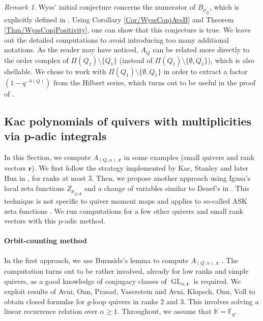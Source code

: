 \documentclass[11pt,english]{article}
\numberwithin{equation}{section}
\numberwithin{figure}{section}
\theoremstyle{definition}
\theoremstyle{plain}
\theoremstyle{remark}
\newtheorem{rmk}[df]{Remark}
\DeclareMathOperator{\GL}{GL}
\newcommand\dd{\mathbf{d}}
\newcommand\rr{\mathbf{r}}
\newcommand\FF{\mathbb{F}}
\newcommand\KK{\mathbb{K}}
\begin{document}
\begin{rmk}

Wyss' initial conjecture concerns the numerator of $B_{\mu_{Q}}$,
which is explicitly defined in \cite[\S 4.6.]{Wys17b}. Using Corollary
\ref{Cor/WyssConjAvsB} and Theorem \ref{Thm/WyssConjPositivity},
one can show that this conjecture is true. We leave out the detailed
computations to avoid introducing too many additional notations. As
the reader may have noticed, $A_{Q}$ can be related more directly
to the order complex of $\Pi(Q_{1})\setminus\{Q_{1}\}$ (instead of
$\Pi(Q_{1})\setminus\{\emptyset,Q_{1}\}$), which is also shellable.
We chose to work with $\Pi(Q_{1})\setminus\{\emptyset,Q_{1}\}$ in
order to extract a factor $(1-q^{-b(Q)})$ from the Hilbert series,
which turns out to be useful in the proof of \cite[Conj. 4.32.]{Wys17b}.

\end{rmk}

\subsection{Kac polynomials of quivers with multiplicities via p-adic integrals
\label{Subsect/KacPol_p-adic}}

In this Section, we compute $A_{(Q,\alpha),\rr}$ in some examples
(small quivers and rank vectors $\rr$). We first follow the strategy
implemented by Kac, Stanley and later Hua in \cite{Kac83,Hua00},
for ranks at most 3. Then, we propose another approach using Igusa's
local zeta functions $Z_{\mu_{Q,\dd}}$ and a change of variables
similar to Denef's in \cite{Den87}. This technique is not specific
to quiver moment maps and applies to so-called ASK zeta functions
\cite{Ros18,RV19,Ros20,CR22}. We run computations for a few other
quivers and small rank vectors with this p-adic method.

\paragraph*{Orbit-counting method}

In the first approach, we use Burnside's lemma to compute $A_{(Q,\alpha),\rr}$
\cite{Kac83,Hua00}. The computation turns out to be rather involved,
already for low ranks and simple quivers, as a good knowledge of conjugacy
classes of $\GL_{\alpha,\rr}$ is required. We exploit results of
Avni, Onn, Prasad, Vaserstein and Avni, Klopsch, Onn, Voll \cite{AOPV09,AKOV16}
to obtain closed formulas for $g$-loop quivers in ranks 2 and 3.
This involves solving a linear recurrence relation over $\alpha\geq1$.
Throughout, we assume that $\KK=\FF_{q}$.
\end{document}
